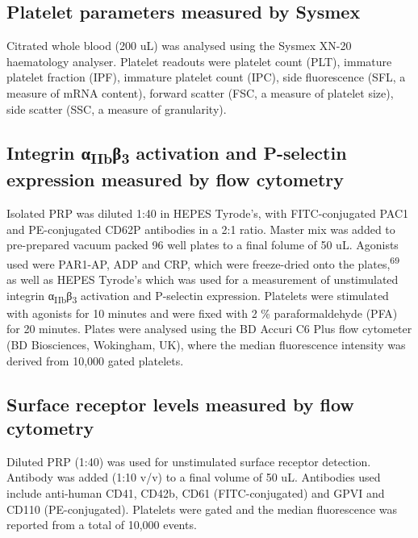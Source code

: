 \documentclass[11pt,twoside]{bristolthesis}
\begin{document}
\hypertarget{platelet-parameters-measured-by-sysmex}{%
\subsection{Platelet parameters measured by Sysmex}\label{platelet-parameters-measured-by-sysmex}}

Citrated whole blood (200 uL) was analysed using the Sysmex XN-20 haematology analyser. Platelet readouts were platelet count (PLT), immature platelet fraction (IPF), immature platelet count (IPC), side fluorescence (SFL, a measure of mRNA content), forward scatter (FSC, a measure of platelet size), side scatter (SSC, a measure of granularity).

\hypertarget{integrin-ux3b1iibux3b23-activation-and-p-selectin-expression-measured-by-flow-cytometry}{%
\subsection{\texorpdfstring{Integrin α\textsubscript{IIb}β\textsubscript{3} activation and P-selectin expression measured by flow cytometry}{Integrin αIIbβ3 activation and P-selectin expression measured by flow cytometry}}\label{integrin-ux3b1iibux3b23-activation-and-p-selectin-expression-measured-by-flow-cytometry}}

Isolated PRP was diluted 1:40 in HEPES Tyrode's, with FITC-conjugated PAC1 and PE-conjugated CD62P antibodies in a 2:1 ratio. Master mix was added to pre-prepared vacuum packed 96 well plates to a final folume of 50 uL. Agonists used were PAR1-AP, ADP and CRP, which were freeze-dried onto the plates,\textsuperscript{69} as well as HEPES Tyrode's which was used for a measurement of unstimulated integrin α\textsubscript{IIb}β\textsubscript{3} activation and P-selectin expression. Platelets were stimulated with agonists for 10 minutes and were fixed with 2 \% paraformaldehyde (PFA) for 20 minutes. Plates were analysed using the BD Accuri C6 Plus flow cytometer (BD Biosciences, Wokingham, UK), where the median fluorescence intensity was derived from 10,000 gated platelets.

\hypertarget{surface-receptor-levels-measured-by-flow-cytometry}{%
\subsection{Surface receptor levels measured by flow cytometry}\label{surface-receptor-levels-measured-by-flow-cytometry}}

Diluted PRP (1:40) was used for unstimulated surface receptor detection. Antibody was added (1:10 v/v) to a final volume of 50 uL. Antibodies used include anti-human CD41, CD42b, CD61 (FITC-conjugated) and GPVI and CD110 (PE-conjugated). Platelets were gated and the median fluorescence was reported from a total of 10,000 events.
\end{document}
